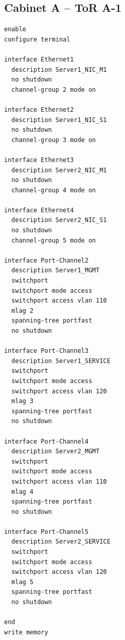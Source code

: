 \subsection{Cabinet A -- ToR A-1}
\begin{lstlisting}[caption={ToR A-1: downlinks to Servers 1 and 2.},basicstyle=\ttfamily\footnotesize,breaklines=true]
enable
configure terminal

interface Ethernet1
  description Server1_NIC_M1
  no shutdown
  channel-group 2 mode on

interface Ethernet2
  description Server1_NIC_S1
  no shutdown
  channel-group 3 mode on

interface Ethernet3
  description Server2_NIC_M1
  no shutdown
  channel-group 4 mode on

interface Ethernet4
  description Server2_NIC_S1
  no shutdown
  channel-group 5 mode on

interface Port-Channel2
  description Server1_MGMT
  switchport
  switchport mode access
  switchport access vlan 110
  mlag 2
  spanning-tree portfast
  no shutdown

interface Port-Channel3
  description Server1_SERVICE
  switchport
  switchport mode access
  switchport access vlan 120
  mlag 3
  spanning-tree portfast
  no shutdown

interface Port-Channel4
  description Server2_MGMT
  switchport
  switchport mode access
  switchport access vlan 110
  mlag 4
  spanning-tree portfast
  no shutdown

interface Port-Channel5
  description Server2_SERVICE
  switchport
  switchport mode access
  switchport access vlan 120
  mlag 5
  spanning-tree portfast
  no shutdown

end
write memory
\end{lstlisting}

